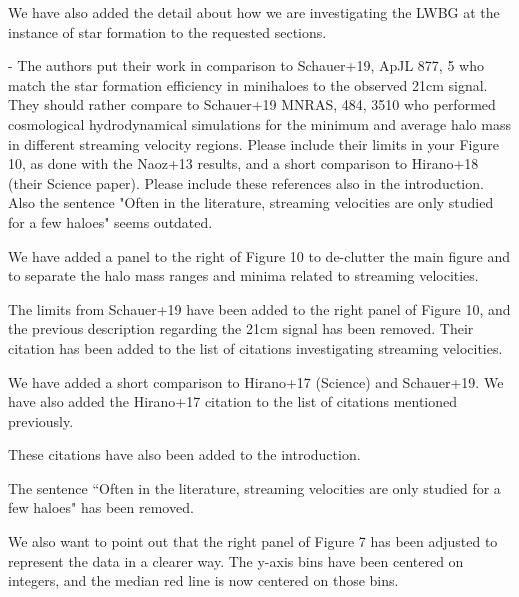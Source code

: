 \documentclass[11pt]{article}
\newenvironment{referee}[1][]{%
    \ignorespaces%
    \begin{mdframed}[style=myquotestyle,#1]%
}{%
    \end{mdframed}%
    \ignorespacesafterend%
}%
\begin{document}
    We have also added the detail about how we are investigating the LWBG at the instance of star formation to the requested sections.

\begin{referee}
    - The authors put their work in comparison to Schauer+19, ApJL 877, 5 who match the star formation efficiency in minihaloes to the observed 21cm signal. They should rather compare to Schauer+19 MNRAS, 484, 3510 who performed cosmological hydrodynamical simulations for the minimum and average halo mass in different streaming velocity regions. Please include their limits in your Figure 10, as done with the Naoz+13 results, and a short comparison to Hirano+18 (their Science paper). Please include these references also in the introduction. Also the sentence "Often in the literature, streaming velocities are only studied for a few haloes" seems outdated.
\end{referee}
    We have added a panel to the right of Figure 10 to de-clutter the main figure and to separate the halo mass ranges and minima related to streaming velocities. 
    
    The limits from Schauer+19 have been added to the right panel of Figure 10, and the previous description regarding the 21cm signal has been removed. Their citation has been added to the list of citations investigating streaming velocities. 

    We have added a short comparison to Hirano+17 (Science) and Schauer+19. We have also added the Hirano+17 citation to the list of citations mentioned previously. 
    
    These citations have also been added to the introduction.

	The sentence ``Often in the literature, streaming velocities are only studied for a few haloes" has been removed.
    
    We also want to point out that the right panel of Figure 7 has been adjusted to represent the data in a clearer way. The y-axis bins have been centered on integers, and the median red line is now centered on those bins. 
\end{document}
